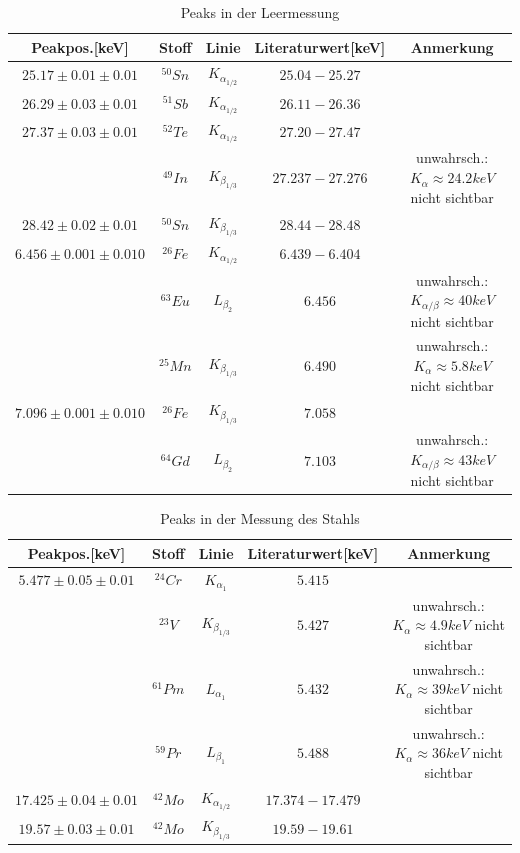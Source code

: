 \documentclass[12pt,a4paper]{article}
\begin{document}
\begin{table}
\center
\begin{tabular}{|c|c|c|c|c|}
\hline 
Peakpos.[keV] & Stoff & Linie & Literaturwert[keV] & Anmerkung \\
\hline 
$25.17\pm 0.01\pm 0.01$& $^{50}Sn$ & $K_{\alpha_{1/2}}$ & $25.04-25.27$ & \\ 
\hline 
$26.29\pm 0.03\pm 0.01$ & $^{51}Sb$ & $K_{\alpha_{1/2}}$ & $26.11-26.36$ & \\ 
\hline 
$27.37\pm 0.03\pm 0.01$ & $^{52}Te$ & $K_{\alpha_{1/2}}$ & $27.20-27.47$ & \\ 
 & $^{49}In$ & $K_{\beta_{1/3}}$ & $27.237-27.276$ & unwahrsch.: $K_{\alpha}\approx 24.2keV$ nicht sichtbar\\ 
\hline 
$28.42\pm 0.02\pm 0.01$ & $^{50}Sn$ & $K_{\beta_{1/3}}$ & $28.44-28.48$ &\\ 
\hline 
$6.456\pm 0.001\pm 0.010$ & $^{26}Fe$ & $K_{\alpha_{1/2}}$ & $6.439-6.404$ &\\ 
& $^{63}Eu$ & $L_{\beta_{2}}$ & $6.456$ & unwahrsch.: $K_{\alpha/\beta}\approx 40keV$ nicht sichtbar\\
& $^{25}Mn$ & $K_{\beta_{1/3}}$ & $6.490$ & unwahrsch.: $K_{\alpha}\approx 5.8keV$ nicht sichtbar\\
\hline 
$7.096\pm 0.001\pm 0.010$ & $^{26}Fe$ & $K_{\beta_{1/3}}$ & $7.058$ & \\ 
& $^{64}Gd$ & $L_{\beta_{2}}$ & $7.103$ & unwahrsch.:$K_{\alpha/\beta}\approx 43keV$ nicht sichtbar\\
\hline 
\end{tabular} 
\caption{Peaks in der Leermessung}
\label{a_peaks_leer}
\end{table}

\begin{table}
\center
\begin{tabular}{|c|c|c|c|c|}
\hline 
Peakpos.[keV] & Stoff & Linie & Literaturwert[keV] & Anmerkung \\
\hline 
$5.477\pm 0.05\pm 0.01$& $^{24}Cr$ & $K_{\alpha_{1}}$ & $5.415$ & \\ 
& $^{23}V$ & $K_{\beta_{1/3}}$ & $5.427$ & unwahrsch.: $K_{\alpha}\approx 4.9keV$ nicht sichtbar\\ 
& $^{61}Pm$ & $L_{\alpha_{1}}$ & $5.432$ & unwahrsch.: $K_{\alpha}\approx 39keV$ nicht sichtbar\\ 
& $^{59}Pr$ & $L_{\beta_{1}}$ & $5.488$ & unwahrsch.: $K_{\alpha}\approx 36keV$ nicht sichtbar\\ 
\hline 
$17.425\pm 0.04\pm 0.01$ & $^{42}Mo$ & $K_{\alpha_{1/2}}$ & $17.374-17.479$ & \\ 
\hline 
$19.57\pm 0.03\pm 0.01$ & $^{42}Mo$ & $K_{\beta_{1/3}}$ & $19.59-19.61$ & \\
 \hline 
\end{tabular} 
\caption{Peaks in der Messung des Stahls}
\label{a_peaks_leer}
\end{table}
\end{document}
